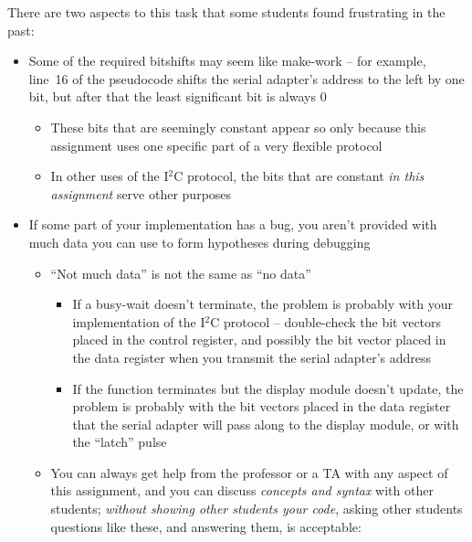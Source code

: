 {    \vspace{0.5cm}

    There are two aspects to this task that some students found frustrating in the past:
    \begin{itemize}
        \item Some of the required bitshifts may seem like make-work -- for example, line~16 of the pseudocode shifts the serial adapter's address to the left by one bit, but after that the least significant bit is always 0
            \begin{itemize}
                \item These bits that are seemingly constant appear so only because this assignment uses one specific part of a very flexible protocol
                \item In other uses of the I$^2$C protocol, the bits that are constant \textit{in this assignment} serve other purposes
            \end{itemize}
        \item If some part of your implementation has a bug, you aren't provided with much data you can use to form hypotheses during debugging
            \begin{itemize}
                \item ``Not much data'' is not the same as ``no data''
                    \begin{itemize}
                        \item If a busy-wait doesn't terminate, the problem is probably with your implementation of the I$^2$C protocol -- double-check the bit vectors placed in the control register, and possibly the bit vector placed in the data register when you transmit the serial adapter's address
                        \item If the function terminates but the display module doesn't update, the problem is probably with the bit vectors placed in the data register that the serial adapter will pass along to the display module, or with the ``latch'' pulse
                    \end{itemize}
                \item You can always get help from the professor or a TA with any aspect of this assignment, and you can discuss \textit{concepts and syntax} with other students;
                    \textit{without showing other students your code}, asking other students questions like these, and answering them, is acceptable:
                    \begin{itemize}

\end{itemize}
\end{itemize}
\end{itemize}}
